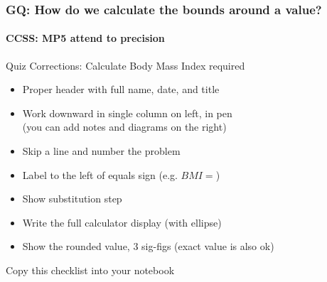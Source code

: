 \documentclass{beamer}
\begin{document}
  \frame
  {
    \frametitle{GQ: How do we calculate the bounds around a value?}
    \framesubtitle{CCSS: MP5 attend to precision}

    \begin{block}{Quiz Corrections: Calculate Body Mass Index 
      \alert{required}}
      \begin{itemize} 
          \item Proper header with full name, date, and title
          \item Work downward in single column on left, in pen 
            \\(you can add notes and diagrams on the right)
          \item Skip a line and number the problem
          \item Label to the left of equals sign (e.g. $BMI=$)
          \item Show substitution step
          \item Write the full calculator display (with ellipse)
          \item Show the rounded value, 3 sig-figs (exact value is also ok)
       \end{itemize}
      \end{block}
    Copy this checklist into your notebook
    
  }
\end{document}
